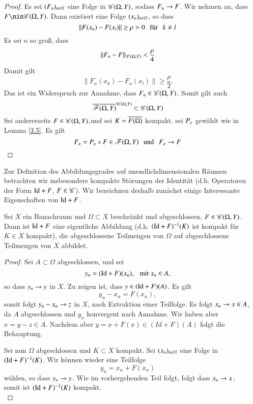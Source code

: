 \begin{proof}
    Es sei $(F_n)_{n\in \mathbb{N}}$ eine Folge in $\mathscr C(\Omega,Y)$, sodass  $F_n\rightarrow F$. Wir nehmen an, dass
    $F\nin \ms C(\Omega,Y)$. Dann existiert eine Folge $(x_n)_{n\in \mathbb{N}}$, so dass
    \[
        \|F(x_n)-F(x_l)\|\geq \rho>0 \hspace{.25cm}\text{für}\hspace{.25cm} k\neq l
    \]
    Es sei $n$ so groß, dass
    \[
        \|F_n-F\|_{\mathscr C(\Omega,Y)}<\frac{\rho}{4}
    \]
    Damit gilt
    \[
        \|F_n(x_k)-F_n(x_l)\|\geq \frac\rho2.
    \]
    Das ist ein Widerspruch zur Annahme, dass $F_n\in \mathscr C(\Omega,Y)$. Somit gilt auch
    \[
        \overline{\mathscr F(\Omega,Y)}^{\mathscr C(\Omega,Y)}\subset \mathscr C(\Omega,Y)
    \]
    Sei andererseits $F\in \mathscr C(\Omega,Y)$,und sei $K=\overline{F(\Omega)}$ kompakt. sei $P_\varepsilon$ gewählt wie
    in Lemma \ref{3.5}. Es gilt
    \[
        F_\varepsilon=P_\varepsilon\circ F\in \mathscr F(\Omega,Y) \hspace{.25cm} \text{und}\hspace{.25cm} F_\varepsilon\rightarrow F
    \]
\end{proof}

Zur Definition des Abbildungsgrades auf unendlichdimensionalen Räumen betrachten wir insbesondere
kompakte Störungen der Identität (d.h. Operatoren der Form $\mathrm{Id}+F$, $F\in \mathscr C$). Wir bezeichnen deshalb
zunächst einige Interessante Eigenschaften von $\mathrm{Id}+F$.

\begin{lem}\label{3.7}
    Sei $X$ ein Banachraum und $\Omega\subset X$ beschränkt und abgeschlossen, $F\in \mathscr C(\Omega,Y)$.
    Dann ist $\mathrm{Id} + F$ eine eigentliche Abbildung (d.h. $(\mathrm{Id}+F)^{-1}(K)$ ist kompakt für $K\in X$ 
    kompakt), die abgeschlossene Teilmengen von $\Omega$ auf abgeschlossene Teilmengen von $X$ abbildet.
\end{lem}

\begin{proof}
    Sei $A\subset \Omega$ abgeschlossen, und sei
    \[
        y_n=(\mathrm{Id}+F)(x_n), \hspace{.25cm} \text{mit } x_n \in A,
    \]
    so dass $y_n \rightarrow y$ in $X$. Zu zeigen ist, dass $y\in (\mathrm{Id}+F)(A)$. Es gilt
    \[
        y_n-x_n=F(x_n),
    \]
    somit folgt $y_n-x_n\rightarrow z$ in $X$, nach Extraktion einer Teilfolge. Es folgt $x_n\rightarrow x \in A$, da
    $A$ abgeschlossen und $y_n$ konvergent nach Annahme. Wir haben aber $x=y-z\in A$. Nachdem aber
    $y=x+F(x)\in (Id+F)(A)$ folgt die Behauptung.

    Sei nun $\Omega$ abgeschlossen und $K\subset X$ kompakt. Sei $(x_n)_{n\in \mathbb{N}}$ eine Folge in
    $(\mathrm{Id}+F)^{-1}(K)$. Wir können wieder eine Teilfolge
    \[
        y_n=x_n+F(x_n)
    \]
    wählen, so dass $y_n\rightarrow y$. Wie im vorhergehenden Teil folgt, folgt dass $x_n\rightarrow x$, somit ist
    $(\mathrm{Id}+F)^{-1}(K)$ kompakt.
    \[ \]
\end{proof}

